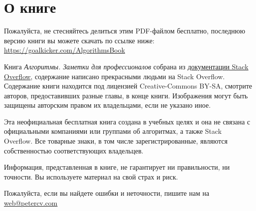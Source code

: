 
\chapter*{О книге}

\vspace{\baselineskip}

\vspace{\baselineskip}

\vspace{\baselineskip}

\vspace{\baselineskip}
\begin{center}
	\begin{tcolorbox}[colback=white, colframe=violet, boxrule=0.5mm, boxsep=8mm, halign=flush center, width=14cm]
	\begin{tcolorbox} [colback=violet!15!white, colframe=white, halign=flush center, boxrule=1mm, boxsep=2mm, arc=3mm]
		Пожалуйста, не стесняйтесь делиться этим PDF-файлом бесплатно,
		последнюю версию книги вы можете скачать по ссылке ниже: \href{https://goalkicker.com/AlgorithmsBook}{\underline{https://goalkicker.com/AlgorithmsBook}}
	\end{tcolorbox}
Книга \textit{Алгоритмы. Заметки для профессионалов} собрана из \href{https://archive.org/details/documentation-dump.7z}{\underline{документации Stack Overflow}}, содержание написано прекрасными людьми на Stack Overflow.
Содержание книги находится под лицензией Creative-Commons BY-SA, смотрите авторов, предоставивших разные главы, в конце книги. Изображения могут быть защищены авторским правом их владельцами, если не указано иное.

\vspace{\baselineskip}
Эта неофициальная бесплатная книга создана в учебных целях и она не связана с официальными компаниями или группами об алгоритмах, а также Stack Overflow. Все товарные знаки, в том числе зарегистрированные, являются собственностью соответствующих владельцев.

\vspace{\baselineskip}
Информация, представленная в книге, не гарантирует ни правильности, ни точности. Вы используете материал на свой страх и риск.

\vspace{\baselineskip}
Пожалуйста, если вы найдете ошибки и неточности, пишите нам на \href{mailto: web@petercv.com}{\underline{web@petercv.com}}
\end{tcolorbox}
\end{center}
\newpage